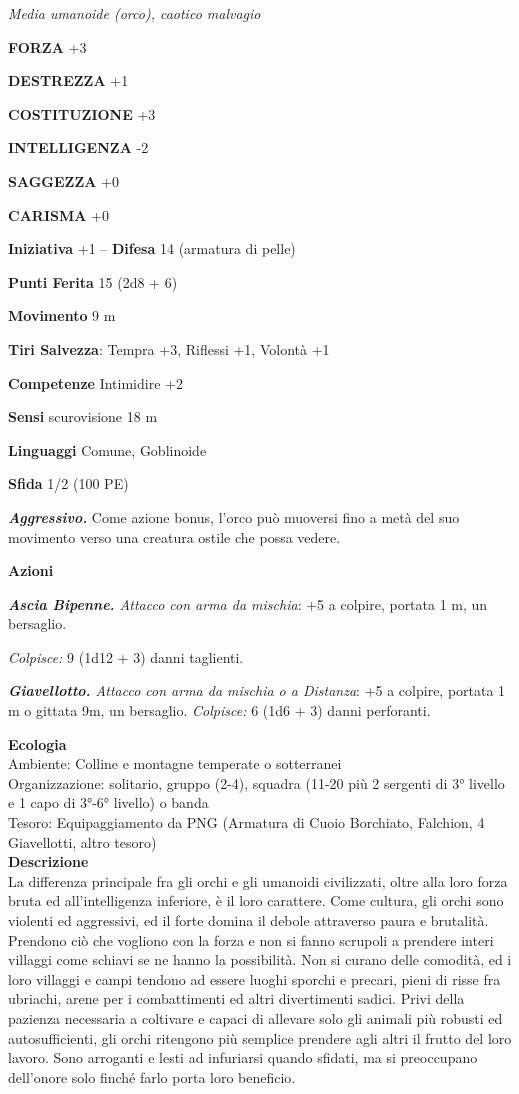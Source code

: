\begin{multicols}{2}
\emph{Media umanoide (orco), caotico malvagio}

\textbf{FORZA} +3

\textbf{DESTREZZA} +1

\textbf{COSTITUZIONE} +3

\textbf{INTELLIGENZA} -2

\textbf{SAGGEZZA} +0

\textbf{CARISMA} +0

\textbf{Iniziativa} +1 -- \textbf{Difesa} 14 (armatura di pelle)

\textbf{Punti Ferita} 15 (2d8 + 6)

\textbf{Movimento} 9 m

\textbf{Tiri Salvezza}: Tempra +3, Riflessi +1, Volontà +1

\textbf{Competenze} Intimidire +2

\textbf{Sensi} scurovisione 18 m

\textbf{Linguaggi} Comune, Goblinoide

\textbf{Sfida} 1/2 (100 PE)

\emph{\textbf{Aggressivo.}} Come azione bonus, l'orco può muoversi fino a metà del suo movimento verso una creatura ostile che possa vedere.

\textbf{Azioni}

\emph{\textbf{Ascia Bipenne.} Attacco con arma da mischia}: +5 a colpire, portata 1 m, un bersaglio.

\emph{Colpisce:} 9 (1d12 + 3) danni taglienti.

\emph{\textbf{Giavellotto.} Attacco con arma da mischia o a Distanza}: +5 a colpire, portata 1 m o gittata 9m, un bersaglio. \emph{Colpisce:} 6 (1d6 + 3) danni perforanti.

\textbf{Ecologia}\\
Ambiente: Colline e montagne temperate o sotterranei\\
Organizzazione: solitario, gruppo (2-4), squadra (11-20 più 2 sergenti di 3° livello e 1 capo di 3°-6° livello) o banda \\
Tesoro: Equipaggiamento da PNG (Armatura di Cuoio Borchiato, Falchion, 4 Giavellotti, altro tesoro)\\
\textbf{Descrizione}\\
La differenza principale fra gli orchi e gli umanoidi civilizzati, oltre alla loro forza bruta ed all'intelligenza inferiore, è il loro carattere. Come cultura, gli orchi sono violenti ed aggressivi, ed il forte domina il debole attraverso paura e brutalità. Prendono ciò che vogliono con la forza e non si fanno scrupoli a prendere interi villaggi come schiavi se ne hanno la possibilità. Non si curano delle comodità, ed i loro villaggi e campi tendono ad essere luoghi sporchi e precari, pieni di risse fra ubriachi, arene per i combattimenti ed altri divertimenti sadici. Privi della pazienza necessaria a coltivare e capaci di allevare solo gli animali più robusti ed autosufficienti, gli orchi ritengono più semplice prendere agli altri il frutto del loro lavoro. Sono arroganti e lesti ad infuriarsi quando sfidati, ma si preoccupano dell'onore solo finché farlo porta loro beneficio.\\


\end{multicols}
